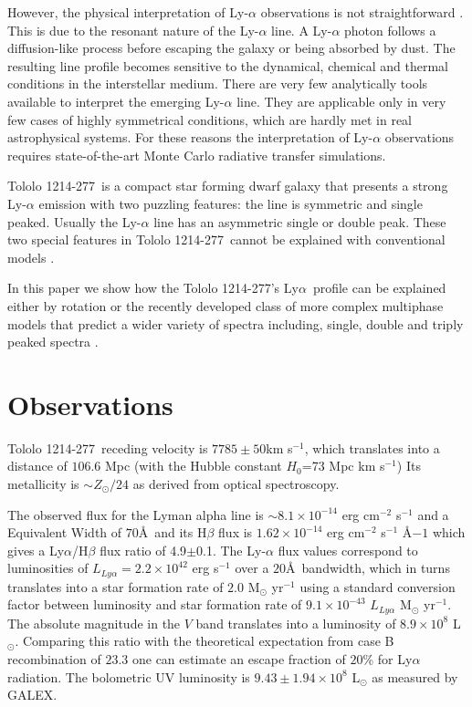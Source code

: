 \documentclass[a4,useAMS,usenatbib,usegraphicx]{mn2e}
\newcommand{\tol}{Tololo 1214-277}
\newcommand{\lya}{Ly$\alpha$}
\begin{document}
However, the physical interpretation of Ly-$\alpha$ observations is
not straightforward \citep{2015ApJ...805...14R}. 
This is due to the resonant nature of the Ly-$\alpha$ line. 
A Ly-$\alpha$ photon follows a diffusion-like process before escaping
the galaxy or being absorbed by dust. 
The resulting line profile becomes sensitive to the dynamical, chemical
and thermal conditions in the interstellar medium. 
There are very few analytically tools available to interpret the
emerging Ly-$\alpha$ line.
They are applicable only in very few cases of highly symmetrical
conditions, which are hardly met in real astrophysical systems.
For these reasons the interpretation of Ly-$\alpha$ observations
requires state-of-the-art Monte Carlo radiative transfer simulations.   


\tol\ is a compact star forming dwarf galaxy that presents a
strong Ly-$\alpha$ emission \citep{Thuan97} with two puzzling 
features: the line is symmetric and single peaked.
Usually the Ly-$\alpha$ line has an asymmetric single or double peak. 
These two special features in \tol\ cannot be explained with
conventional models \citep{2006A&A...460..397V,2015ApJ...812..123G}.  

In this paper we show how the \tol's \lya\ profile can be explained
either by rotation \citep{GaravitoCamargo2014} or the recently developed
class of more complex 
multiphase models that predict a wider variety of spectra
including, single, double and triply peaked spectra \citep{Gronke2016}.  

\section{Observations}


\tol\ receding velocity is $7785\pm 50$km s$^{-1}$, which translates
into a distance of $106.6$ Mpc (with the Hubble constant $H_{0}$=73
Mpc km s$^{-1}$) 
Its metallicity is $\sim Z_{\odot}/24$ \citep{Izotov04} as derived from optical
spectroscopy. 


The observed flux for the Lyman alpha line is $\sim
8.1\times 10^{-14}$ erg cm$^{-2}$ s$^{-1}$ \citep{Thuan97}
and a Equivalent Width of $70$\AA\ and its H$\beta$ flux is 
$1.62\times 10^{-14}$ erg cm$^{-2}$ s$^{-1}$ \AA${-1}$
\citep{Izotov04} which gives a Ly$\alpha$/H$\beta$ flux ratio of
4.9$\pm$0.1. The Ly-$\alpha$ flux values correspond to luminosities of
$L_{Ly\alpha}=2.2\times 10^{42}$ erg s$^{-1}$ over a $20$\AA\ 
bandwidth, which in turns translates  into a star formation rate of
$2.0$ M$_{\odot}$ yr$^{-1}$ using a standard conversion factor between
luminosity and star formation rate of $9.1\times 10^{-43}$
$L_{Ly\alpha}$ M$_{\odot}$ yr$^{-1}$. 
The absolute magnitude in the $V$ band translates into a luminosity of
$8.9\times 10^{8}$ L$_{\odot}$.
Comparing this ratio with the theoretical expectation from case B
recombination of $23.3$ \citep{Hummer1987} one can estimate an escape
fraction of $20$\% for Ly$\alpha$ radiation.
The bolometric UV luminosity is $9.43\pm1.94 \times 10^{8}$
L$_{\odot}$ as measured by GALEX. 
\end{document}
